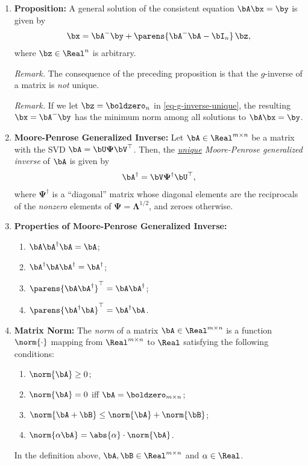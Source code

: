 \documentclass[12pt]{article}
\begin{document}
\begin{enumerate}[label=\textbf{\arabic*.}]
	\item \textbf{Proposition:} A general solution of the consistent equation $ \bA \bx = \by $ is given by 
	\begin{align*}\label{eq-g-inverse-unique}
		\bx = \bA^- \by + \parens{\bA^- \bA - \bI_n} \, \bz, 
	\end{align*}
	where $\bz \in \Real^n$ is arbitrary. 
	
	\textit{Remark.} The consequence of the preceding proposition is that the $g$-inverse of a matrix is \emph{not} unique. 
	
	\textit{Remark.} If we let $\bz = \boldzero_n$ in \eqref{eq-g-inverse-unique}, the resulting $\bx = \bA^- \by$ has the minimum norm among all solutions to $\bA \bx = \by $. 
	
	\item \textbf{Moore-Penrose Generalized Inverse:} Let $\bA \in \Real^{m \times n}$ be a matrix with the SVD $\bA = \bU \boldsymbol{\Psi} \bV^{\top}$. Then, the \emph{\underline{unique} Moore-Penrose generalized inverse} of $\bA$ is given by 
	\begin{align*}
		\bA^\dag = \bV \boldsymbol{\Psi}^\dag \bU^\top, 
	\end{align*}
	where $\boldsymbol{\Psi}^\dag$ is a ``diagonal'' matrix whose diagonal elements are the reciprocals of the \emph{nonzero} elements of $ \boldsymbol{\Psi} = \boldsymbol{\Lambda}^{1/2}$, and zeroes otherwise. 
	
	\item \textbf{Properties of Moore-Penrose Generalized Inverse:} 
	\begin{enumerate}
		\item $\bA \bA^\dag \bA = \bA$; 
		\item $\bA^\dag \bA \bA^\dag = \bA^\dag$; 
		\item $\parens{\bA \bA^\dag}^\top = \bA \bA^\dag$; 
		\item $\parens{\bA^\dag \bA}^\top = \bA^\dag \bA$. 
	\end{enumerate}
	
	\item \textbf{Matrix Norm:} The \textit{norm} of a matrix $\bA \in \Real^{m \times n}$ is a function $\norm{\cdot}$ mapping from $\Real^{m \times n}$ to $\Real$ satisfying the following conditions: 
	\begin{enumerate}
		\item $\norm{\bA} \ge 0$; 
		\item $\norm{\bA} = 0$ iff $ \bA = \boldzero_{m \times n}$; 
		\item $\norm{\bA + \bB} \le \norm{\bA} + \norm{\bB} $; 
		\item $\norm{\alpha \bA} = \abs{\alpha} \cdot \norm{\bA}$. 
	\end{enumerate}
	In the definition above, $\bA, \bB \in \Real^{m \times n}$ and $\alpha \in \Real$. 
	

\end{enumerate}
\end{document}
